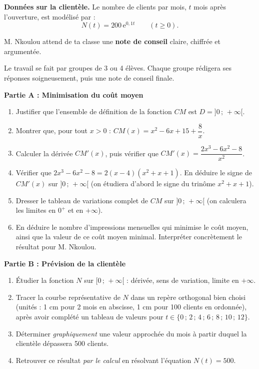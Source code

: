 \documentclass[11pt]{article}
\newcounter{popsec}
\newcounter{popsub}
\newcommand{\courssub}[1]{%
  \stepcounter{popsub}%
  \par\vspace{9pt}\noindent{\popxbold\fontsize{11.5}{13}\selectfont\color{popink}{\color{poporange}\thepopsec.\thepopsub}\hspace{6pt}#1}\par\nopagebreak\vspace{4pt}
}
\begin{document}
\textbf{Données sur la clientèle.} Le nombre de clients par mois, $t$ mois après l'ouverture, est modélisé par :
\[ N(t) = 200\,\mathrm{e}^{0{,}1t} \qquad (t \geq 0). \]

M. Nkoulou attend de ta classe une \textbf{note de conseil} claire, chiffrée et argumentée.

\courssub{Consignes}

Le travail se fait par groupes de 3 ou 4 élèves. Chaque groupe rédigera ses réponses soigneusement, puis une note de conseil finale.

\textbf{Partie A : Minimisation du coût moyen}

\begin{enumerate}
\item Justifier que l'ensemble de définition de la fonction $CM$ est $D = ]0\,;\,+\infty[$.
\item Montrer que, pour tout $x > 0$ : $CM(x) = x^2 - 6x + 15 + \dfrac{8}{x}$.
\item Calculer la dérivée $CM'(x)$, puis vérifier que $CM'(x) = \dfrac{2x^3 - 6x^2 - 8}{x^2}$.
\item Vérifier que $2x^3 - 6x^2 - 8 = 2(x - 4)(x^2 + x + 1)$. En déduire le signe de $CM'(x)$ sur $]0\,;\,+\infty[$ (on étudiera d'abord le signe du trinôme $x^2 + x + 1$).
\item Dresser le tableau de variations complet de $CM$ sur $]0\,;\,+\infty[$ (on calculera les limites en $0^+$ et en $+\infty$).
\item En déduire le nombre d'impressions mensuelles qui minimise le coût moyen, ainsi que la valeur de ce coût moyen minimal. Interpréter concrètement le résultat pour M. Nkoulou.
\end{enumerate}

\textbf{Partie B : Prévision de la clientèle}

\begin{enumerate}
\item Étudier la fonction $N$ sur $[0\,;\,+\infty[$ : dérivée, sens de variation, limite en $+\infty$.
\item Tracer la courbe représentative de $N$ dans un repère orthogonal bien choisi (unités : 1 cm pour 2 mois en abscisse, 1 cm pour 100 clients en ordonnée), après avoir complété un tableau de valeurs pour $t \in \{0\,;\,2\,;\,4\,;\,6\,;\,8\,;\,10\,;\,12\}$.
\item Déterminer \emph{graphiquement} une valeur approchée du mois à partir duquel la clientèle dépassera 500 clients.
\item Retrouver ce résultat \emph{par le calcul} en résolvant l'équation $N(t) = 500$.
\end{enumerate}
\end{document}
